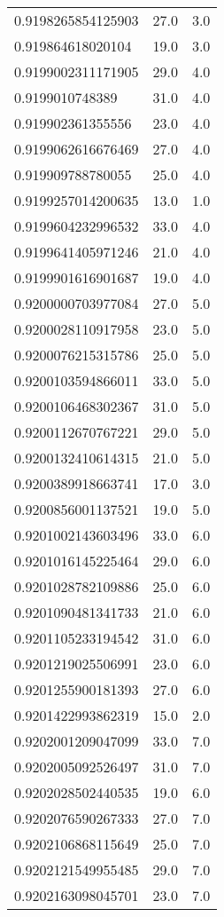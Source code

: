 \begin{center}
\begin{supertabular}[H]{p{0.30\textwidth}p{0.05\textwidth}p{0.05\textwidth}}
0.9198265854125903 & 27.0 & 3.0 \\ 
0.919864618020104 & 19.0 & 3.0 \\ 
0.9199002311171905 & 29.0 & 4.0 \\ 
0.9199010748389 & 31.0 & 4.0 \\ 
0.919902361355556 & 23.0 & 4.0 \\ 
0.9199062616676469 & 27.0 & 4.0 \\ 
0.919909788780055 & 25.0 & 4.0 \\ 
0.9199257014200635 & 13.0 & 1.0 \\ 
0.9199604232996532 & 33.0 & 4.0 \\ 
0.9199641405971246 & 21.0 & 4.0 \\ 
0.9199901616901687 & 19.0 & 4.0 \\ 
0.9200000703977084 & 27.0 & 5.0 \\ 
0.9200028110917958 & 23.0 & 5.0 \\ 
0.9200076215315786 & 25.0 & 5.0 \\ 
0.9200103594866011 & 33.0 & 5.0 \\ 
0.9200106468302367 & 31.0 & 5.0 \\ 
0.9200112670767221 & 29.0 & 5.0 \\ 
0.9200132410614315 & 21.0 & 5.0 \\ 
0.9200389918663741 & 17.0 & 3.0 \\ 
0.9200856001137521 & 19.0 & 5.0 \\ 
0.9201002143603496 & 33.0 & 6.0 \\ 
0.9201016145225464 & 29.0 & 6.0 \\ 
0.9201028782109886 & 25.0 & 6.0 \\ 
0.9201090481341733 & 21.0 & 6.0 \\ 
0.9201105233194542 & 31.0 & 6.0 \\ 
0.9201219025506991 & 23.0 & 6.0 \\ 
0.9201255900181393 & 27.0 & 6.0 \\ 
0.9201422993862319 & 15.0 & 2.0 \\ 
0.9202001209047099 & 33.0 & 7.0 \\ 
0.9202005092526497 & 31.0 & 7.0 \\ 
0.9202028502440535 & 19.0 & 6.0 \\ 
0.9202076590267333 & 27.0 & 7.0 \\ 
0.9202106868115649 & 25.0 & 7.0 \\ 
0.9202121549955485 & 29.0 & 7.0 \\ 
0.9202163098045701 & 23.0 & 7.0 \\ 

\end{supertabular}
\end{center}
